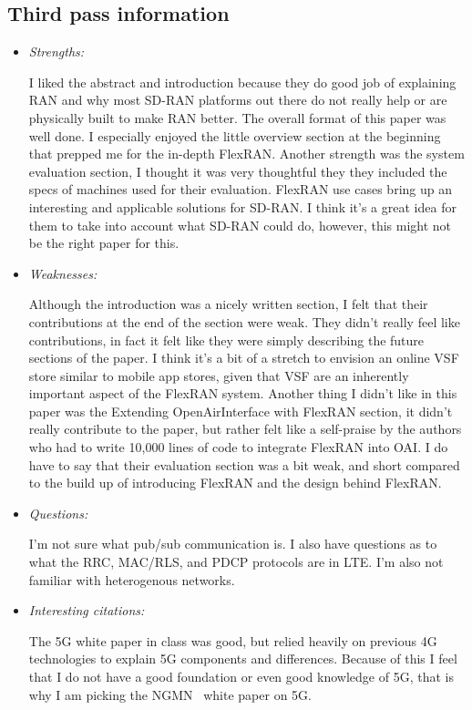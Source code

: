\documentclass[letterpaper,twocolumn,10pt]{article}
\begin{document}
\subsection{Third pass information}
\label{sec:third}
\begin{itemize}

\item {\it Strengths:}

I liked the abstract and introduction because they do good job of explaining RAN and why most SD-RAN platforms
out there do not really help or are physically built to make RAN better. The overall format of this paper was well done. I especially 
enjoyed the little overview section at the beginning that prepped me for the in-depth FlexRAN. Another strength was 
the system evaluation section, I thought it was very thoughtful they they included the specs of machines used for their
evaluation. FlexRAN use cases bring up an interesting and applicable solutions for SD-RAN. I think it's a great idea for 
them to take into account what SD-RAN could do, however, this might not be the right paper for this.

\item {\it Weaknesses:} 

Although the introduction was a nicely written section, I felt that their contributions at the end of the section were weak.
They didn't really feel like contributions, in fact it felt like they were simply describing the future sections of the paper. 
I think it's a bit of a stretch to envision an online VSF store similar to mobile app stores, given that VSF are an inherently 
important aspect of the FlexRAN system. Another thing I didn't like in this paper was the Extending OpenAirInterface with 
FlexRAN section, it didn't really contribute to the paper, but rather felt like a self-praise by the authors who had to write 10,000
lines of code to integrate FlexRAN into OAI. I do have to say that their evaluation section was a bit weak, and short compared to
the build up of introducing FlexRAN and the design behind FlexRAN. 

\item {\it Questions:} 

I'm not sure what pub/sub communication is. I also have questions as to what the RRC, MAC/RLS,  and PDCP protocols are
in LTE. I'm also not familiar with heterogenous networks. 

\item {\it Interesting citations:} 

The 5G white paper in class was good, but relied heavily on previous 4G technologies to explain 5G components and 
differences. Because of this I feel that I do not have a good foundation or even good knowledge of 5G, that is why I am
picking the NGMN~\cite{ngmn} white paper on 5G. 


\end{itemize}
\end{document}
